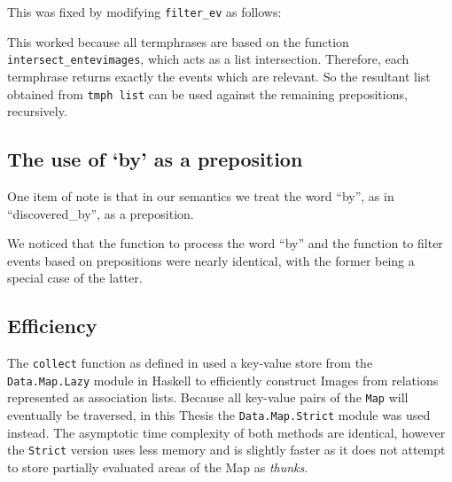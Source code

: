 \documentclass[../main.tex]{subfiles}
\begin{document}
This was fixed by modifying \texttt{filter\_ev} as follows:

This worked because all termphrases are based on the function \texttt{intersect\_entevimages}, which acts as a list intersection.
Therefore, each termphrase returns exactly the events which are relevant.  So the resultant list obtained from \texttt{tmph list}
can be used against the remaining prepositions, recursively.


\subsection{The use of `by' as a preposition}

One item of note is that in our semantics we treat the word ``by'', as in ``discovered\_by'', as a preposition.

We noticed that the function to process the word ``by'' and the function to filter events based on prepositions were nearly 
identical, with the former being a special case of the latter.

\subsection{Efficiency}

The \texttt{collect} function as defined in \cite{agboola2015extensible} used a key-value store from the \texttt{Data.Map.Lazy} module in Haskell to efficiently construct Images from relations represented as association lists.  Because all key-value pairs of the \texttt{Map} will eventually be traversed, in this Thesis the \texttt{Data.Map.Strict} module was used instead.  The asymptotic time complexity of both methods are identical, however the \texttt{Strict} version uses less memory and is slightly faster as it does not attempt to store partially evaluated areas of the Map as {\em thunks}.




\end{document}
